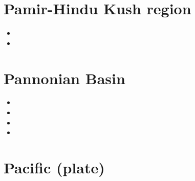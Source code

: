

\section{Pamir-Hindu Kush region}

\begin{small}
\begin{itemize}
\item[\twothousandseven]
\item[\twothousandsixteen]
\end{itemize}
\end{small}

\section{Pannonian Basin}

\begin{small}
\begin{itemize}
\item[\twothousandone]
\item[\twothousandtwo]
\item[\twothousandeleven]
\item[\twothousandtwentyone]
\end{itemize}
\end{small}

\section{Pacific (plate)}

